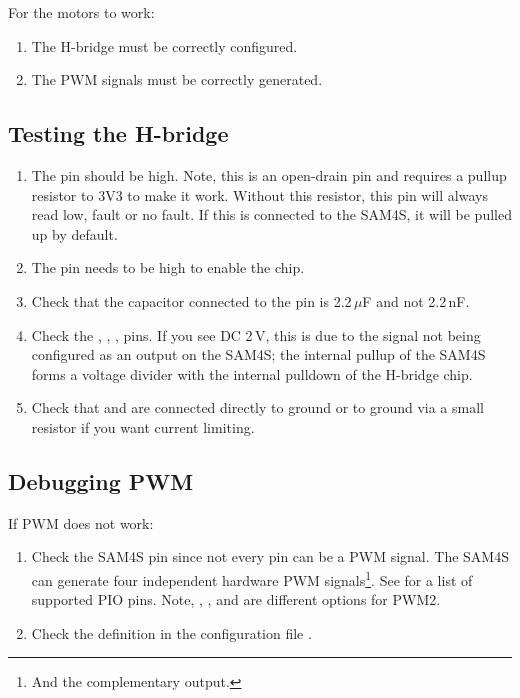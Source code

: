 For the motors to work:
%
\begin{enumerate}
\item The H-bridge must be correctly configured.
\item The PWM signals must be correctly generated.
\end{enumerate}


\subsection{Testing the H-bridge}
\label{testing-the-h-bridge}

\begin{enumerate}
\item The  pin should be high.  Note, this is an
  open-drain pin and requires a pullup resistor to 3V3 to make it
  work.  Without this resistor, this pin will always read low, fault
  or no fault.  If this is connected to the SAM4S, it will be pulled
  up by default.

\item The  pin needs to be high to enable the chip.

\item Check that the capacitor connected to the  pin is
  2.2\,$\mu$F and not 2.2\,nF.

\item Check the , , ,  pins.
  If you see DC 2\,V, this is due to the signal not being configured
  as an output on the SAM4S; the internal pullup of the SAM4S forms a
  voltage divider with the internal pulldown of the H-bridge chip.

\item Check that  and  are connected
  directly to ground or to ground via a small resistor if you want
  current limiting.
\end{enumerate}


\subsection{Debugging PWM}
\label{debugging-pwm}

If PWM does not work:

\begin{enumerate}
\item
  Check the SAM4S pin since not every pin can be a PWM signal.  The
  SAM4S can generate four independent hardware PWM
  signals\footnote{And the complementary output.}. See
   for a list of supported PIO pins.  Note,
  , , and  are different options for
  PWM2.

\item
  Check the definition in the configuration file .
\end{enumerate}

